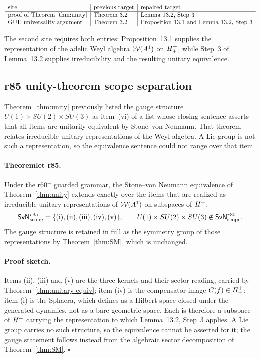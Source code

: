 \[
\begin{array}{l|l|l}
\text{site} & \text{previous target} & \text{repaired target}\\
\hline
\text{proof of Theorem~\ref{thm:unity}} & \text{Theorem 3.2} &
\text{Lemma 13.2, Step 3}\\
\text{GUE universality argument} & \text{Theorem 3.2} &
\text{Proposition 13.1 and Lemma 13.2, Step 3}
\end{array}
\]

The second site requires both entries: Proposition~13.1 supplies the representation of the
adelic Weyl algebra \(\mathcal{W}(A^1)\) on \(H^+_+\), while Step~3 of Lemma~13.2 supplies
irreducibility and the resulting unitary equivalence.

\subsection*{r85 unity-theorem scope separation}
\label{subsec:r85-unity-scope-separation}

Theorem~\ref{thm:unity} previously listed the gauge structure
\(U(1)\times SU(2)\times SU(3)\) as item~(vi) of a list whose closing sentence asserts that
all items are unitarily equivalent by Stone--von Neumann.  That theorem relates irreducible
unitary representations of the Weyl algebra.  A Lie group is not such a representation, so the
equivalence sentence could not range over that item.

\paragraph{Theoremlet r85.}
Under the r60\(^+\) guarded grammar, the Stone--von Neumann equivalence of
Theorem~\ref{thm:unity} extends exactly over the items that are realized as irreducible
unitary representations of \(\mathcal{W}(A^1)\) on subspaces of \(H^+\):
\[
\mathsf{SvN}_{\rm scope}^{r85}=\{(\mathrm{i}),(\mathrm{ii}),(\mathrm{iii}),
(\mathrm{iv}),(\mathrm{v})\},
\qquad
U(1)\times SU(2)\times SU(3)\notin\mathsf{SvN}_{\rm scope}^{r85}.
\]
The gauge structure is retained in full as the symmetry group of those representations by
Theorem~\ref{thm:SM}, which is unchanged.

\paragraph{Proof sketch.}
Items (ii), (iii) and (v) are the three kernels and their sector reading, carried by
Theorem~\ref{thm:unitary-equiv}; item (iv) is the compensator image \(C(f)\in H^+_+\);
item (i) is the Sphaera, which \cite{brendecke2026rh} defines as a Hilbert space closed under
the generated dynamics, not as a bare geometric space.  Each is therefore a subspace of
\(H^+\) carrying the representation to which Lemma~13.2, Step~3 applies.  A Lie group
carries no such structure, so the equivalence cannot be asserted for it; the gauge statement
follows instead from the algebraic sector decomposition of Theorem~\ref{thm:SM}.  \(\square\)

